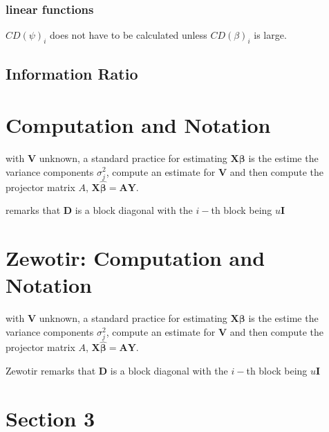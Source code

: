 \documentclass[12pt, a4paper]{article}
\begin{document}
\subsubsection{linear functions}


$CD(\psi)_i$ does not have to be calculated unless $CD(\beta)_i$ is large.




\subsection{Information Ratio}




\newpage

\section{Computation and Notation } %
with $\boldsymbol{V}$ unknown, a standard practice for estimating $\boldsymbol{X \beta}$ is the estime the variance components $\sigma^2_j$,
compute an estimate for $\boldsymbol{V}$ and then compute the projector matrix $A$, $\boldsymbol{X \hat{\beta}}  = \boldsymbol{AY}$.


\citet{zewotir} remarks that $\boldsymbol{D}$ is a block diagonal with the $i-$th block being $u \boldsymbol{I}$





\section{Zewotir: Computation and Notation } %
with $\boldsymbol{V}$ unknown, a standard practice for estimating $\boldsymbol{X \beta}$ is the estime the variance components $\sigma^2_j$,
compute an estimate for $\boldsymbol{V}$ and then compute the projector matrix $A$, $\boldsymbol{X \hat{\beta}}  = \boldsymbol{AY}$.


Zewotir remarks that $\boldsymbol{D}$ is a block diagonal with the $i-$th block being $u \boldsymbol{I}$


\section{Section 3}
\end{document}
